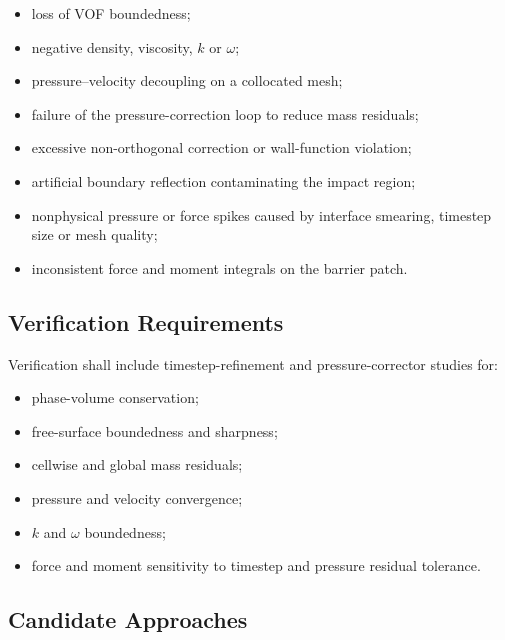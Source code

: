 \begin{itemize}
  \item loss of VOF boundedness;
  \item negative density, viscosity, $k$ or $\omega$;
  \item pressure--velocity decoupling on a collocated mesh;
  \item failure of the pressure-correction loop to reduce mass
    residuals;
  \item excessive non-orthogonal correction or wall-function violation;
  \item artificial boundary reflection contaminating the impact region;
  \item nonphysical pressure or force spikes caused by interface
    smearing, timestep size or mesh quality;
  \item inconsistent force and moment integrals on the barrier patch.
\end{itemize}

\subsection{Verification Requirements}
\label{sec:res-num-stb-verification-requirements}


Verification shall include timestep-refinement and pressure-corrector
studies for:

\begin{itemize}
  \item phase-volume conservation;
  \item free-surface boundedness and sharpness;
  \item cellwise and global mass residuals;
  \item pressure and velocity convergence;
  \item $k$ and $\omega$ boundedness;
  \item force and moment sensitivity to timestep and pressure
    residual tolerance.
\end{itemize}

\subsection{Candidate Approaches}
\label{sec:res-num-stb-candidate-approaches}


